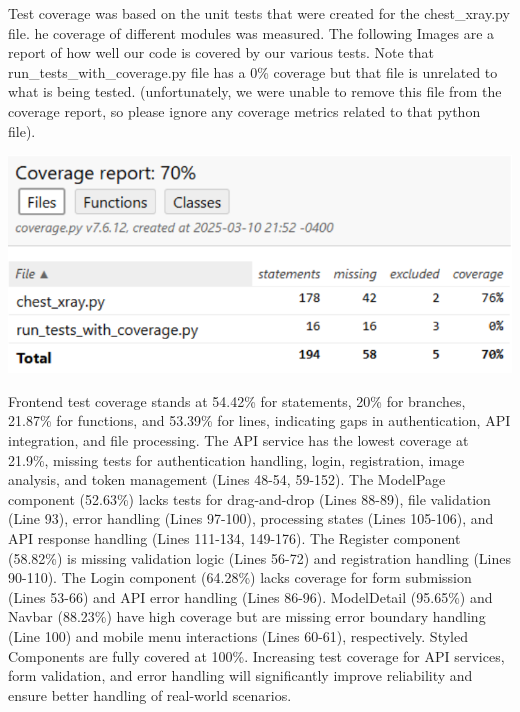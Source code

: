 \documentclass[12pt, titlepage]{article}
\begin{document}
Test coverage was based on the unit tests that were created for the chest\_xray.py file. he coverage of different modules was measured. The following Images are a report of how well our code is covered by our various tests. Note that run\_tests\_with\_coverage.py file has a 0\% coverage but that file is unrelated to what is being tested. (unfortunately, we were unable to remove this file from the coverage report, so please ignore any coverage metrics related to that python file).

\includegraphics[width=\textwidth]{codecoverage.png}

Frontend test coverage stands at 54.42\% for statements, 20\% for branches, 21.87\% for functions, and 53.39\% for lines, indicating gaps in authentication, API integration, and file processing. The API service has the lowest coverage at 21.9\%, missing tests for authentication handling, login, registration, image analysis, and token management (Lines 48-54, 59-152). The ModelPage component (52.63\%) lacks tests for drag-and-drop (Lines 88-89), file validation (Line 93), error handling (Lines 97-100), processing states (Lines 105-106), and API response handling (Lines 111-134, 149-176).
The Register component (58.82\%) is missing validation logic (Lines 56-72) and registration handling (Lines 90-110). The Login component (64.28\%) lacks coverage for form submission (Lines 53-66) and API error handling (Lines 86-96). ModelDetail (95.65\%) and Navbar (88.23\%) have high coverage but are missing error boundary handling (Line 100) and mobile menu interactions (Lines 60-61), respectively. Styled Components are fully covered at 100\%.
Increasing test coverage for API services, form validation, and error handling will significantly improve reliability and ensure better handling of real-world scenarios.





\newpage{}
\end{document}
